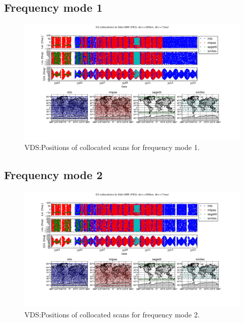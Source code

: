 \clearpage
\newpage

\subsection{Frequency mode 1}

\begin{figure}[t]
\centering
\includegraphics[width=17cm]{test_collocation_fm1.png}
\caption{VDS:Positions of collocated scans for frequency mode 1.}
\label{fig:vdsfm1}
\end{figure}


\clearpage
\newpage

\subsection{Frequency mode 2}

\begin{figure}[t]
\centering
\includegraphics[width=17cm]{test_collocation_fm2.png}
\caption{VDS:Positions of collocated scans for frequency mode 2.}
\label{fig:vdsfm2}
\end{figure}

\clearpage
\newpage

